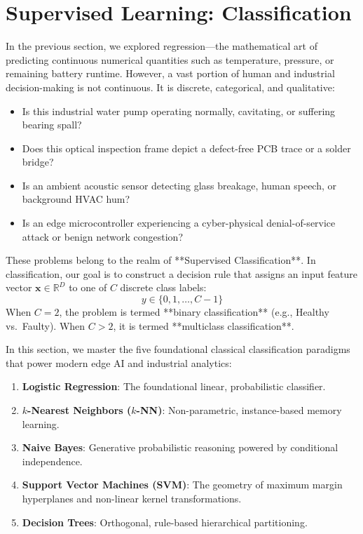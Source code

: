 \section{Supervised Learning: Classification}\label{sec:classification}

In the previous section, we explored regression---the mathematical art of predicting continuous numerical quantities such as temperature, pressure, or remaining battery runtime. However, a vast portion of human and industrial decision-making is not continuous. It is discrete, categorical, and qualitative:
\begin{itemize}
    \item Is this industrial water pump operating normally, cavitating, or suffering bearing spall?
    \item Does this optical inspection frame depict a defect-free PCB trace or a solder bridge?
    \item Is an ambient acoustic sensor detecting glass breakage, human speech, or background HVAC hum?
    \item Is an edge microcontroller experiencing a cyber-physical denial-of-service attack or benign network congestion?
\end{itemize}

These problems belong to the realm of **Supervised Classification**. In classification, our goal is to construct a decision rule that assigns an input feature vector $\mathbf{x} \in \mathbb{R}^D$ to one of $C$ discrete class labels:
\begin{equation}
y \in \{0, 1, \dots, C - 1\}\label{eq:classification_label_set}
\end{equation}
When $C = 2$, the problem is termed **binary classification** (e.g., Healthy vs.\ Faulty). When $C > 2$, it is termed **multiclass classification**.

In this section, we master the five foundational classical classification paradigms that power modern edge AI and industrial analytics:
\begin{enumerate}
    \item \textbf{Logistic Regression}: The foundational linear, probabilistic classifier.
    \item \textbf{$k$-Nearest Neighbors ($k$-NN)}: Non-parametric, instance-based memory learning.
    \item \textbf{Naive Bayes}: Generative probabilistic reasoning powered by conditional independence.
    \item \textbf{Support Vector Machines (SVM)}: The geometry of maximum margin hyperplanes and non-linear kernel transformations.
    \item \textbf{Decision Trees}: Orthogonal, rule-based hierarchical partitioning.
\end{enumerate}

